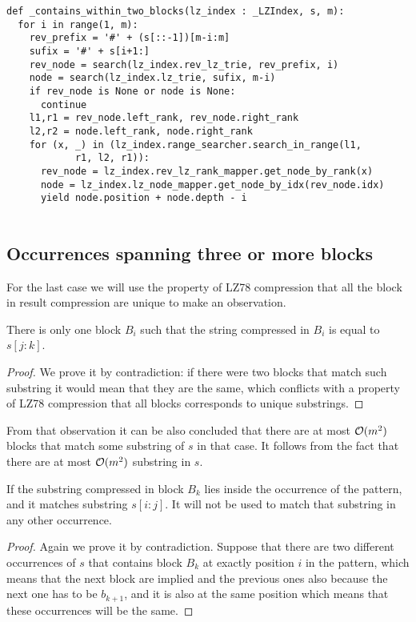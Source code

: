 \begin{verbatim}
def _contains_within_two_blocks(lz_index : _LZIndex, s, m):
  for i in range(1, m):
    rev_prefix = '#' + (s[::-1])[m-i:m]
    sufix = '#' + s[i+1:]
    rev_node = search(lz_index.rev_lz_trie, rev_prefix, i)
    node = search(lz_index.lz_trie, sufix, m-i)
    if rev_node is None or node is None:
      continue
    l1,r1 = rev_node.left_rank, rev_node.right_rank
    l2,r2 = node.left_rank, node.right_rank
    for (x, _) in (lz_index.range_searcher.search_in_range(l1,
            r1, l2, r1)):
      rev_node = lz_index.rev_lz_rank_mapper.get_node_by_rank(x)
      node = lz_index.lz_node_mapper.get_node_by_idx(rev_node.idx)
      yield node.position + node.depth - i
      
\end{verbatim}


\subsection{Occurrences spanning three or more blocks}
For the last case we will use the property of LZ78 compression that all the block in result compression are unique to make an observation. 

\begin{observation} \cite{LZIndex} 
    There is only one block $B_i$ such that the string compressed in $B_i$ is equal to $s[j:k]$. 
\end{observation}
\begin{proof}
    We prove it by contradiction: if there were two blocks that match such substring it would mean that they are the same, which conflicts with a property of LZ78 compression that all blocks corresponds to unique substrings. 
\end{proof}
From that observation it can be also concluded that there are at most $\mathcal{O}(m^2)$ blocks that match some substring of $s$ in that case. It follows from the fact that there are at most $\mathcal{O}(m^2)$ substring in $s$.

\begin{observation}
    If the substring compressed in block $B_k$ lies inside the occurrence of the pattern, and it matches substring $s[i:j]$. It will not be used to match that substring in any other occurrence.
\end{observation}

\begin{proof}
    Again we prove it by contradiction. Suppose that there are two different occurrences of $s$ that contains block $B_k$ at exactly position $i$ in the pattern, which means that the next block are implied and the previous ones also because the next one has to be $b_{k+1}$, and it is also at the same position which means that these occurrences will be the same.
\end{proof}

